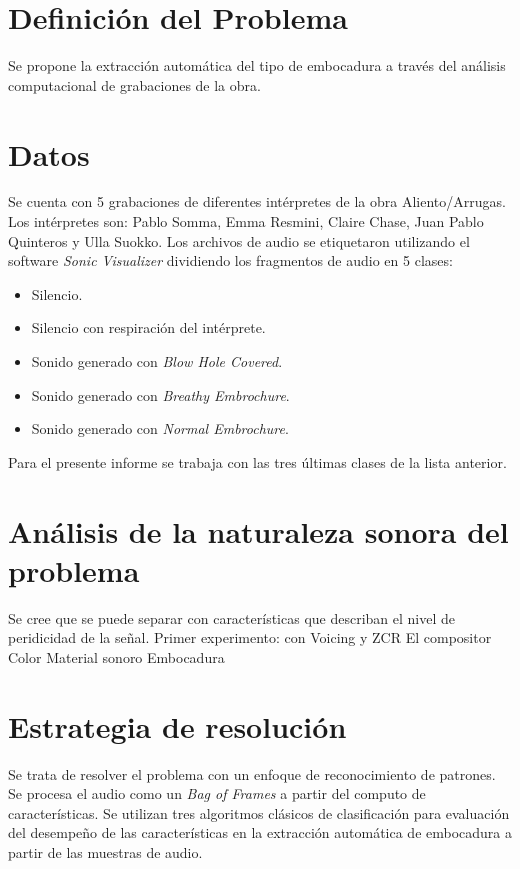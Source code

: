 \documentclass{article}
\begin{document}
\section*{Definición del Problema}
Se propone la extracción automática del tipo de embocadura a través del análisis computacional de grabaciones de la obra. 

\section*{Datos}
Se cuenta con 5 grabaciones de diferentes intérpretes de la obra Aliento/Arrugas. Los intérpretes son: Pablo Somma, Emma Resmini, Claire Chase, Juan Pablo Quinteros y Ulla Suokko. Los archivos de audio se etiquetaron utilizando el software \textit{Sonic Visualizer} dividiendo los fragmentos de audio en 5 clases:

\begin{itemize} 
  \item Silencio.
  \item Silencio con respiración del intérprete. 
  \item Sonido generado con \textit{Blow Hole Covered}.
  \item Sonido generado con \textit{Breathy Embrochure}.
  \item Sonido generado con \textit{Normal Embrochure}.
\end{itemize}

Para el presente informe se trabaja con las tres últimas clases de la lista anterior. 

\section{Análisis de la naturaleza sonora del problema}

Se cree que se puede separar con características que describan el nivel de peridicidad de la señal. 
Primer experimento: con Voicing y ZCR \citep[Chapter~4]{rabiner1978digital}
El compositor 
Color
Material sonoro
Embocadura

\section{Estrategia de resolución}

Se trata de resolver el problema con un enfoque de reconocimiento de patrones. Se procesa el audio como un \textit{Bag of Frames} a partir del computo de características. Se utilizan tres algoritmos clásicos de clasificación para evaluación del desempeño de las características en la extracción automática de embocadura a partir de las muestras de audio.
\end{document}
